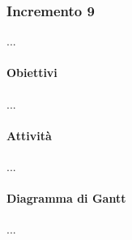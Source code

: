 \subsubsection{Incremento 9}
...
\paragraph{Obiettivi}
...
\paragraph{Attività}
...
\paragraph{Diagramma di Gantt}
...


